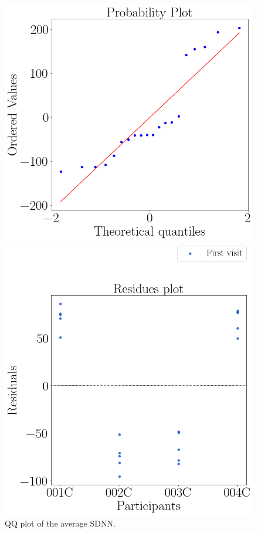         \begin{figure}[!htb]
            \begin{minipage}{0.45\linewidth}
                \centering
                \includegraphics[width = \linewidth]{Resultados/ECG/Figuras/png/qqplot_sdnn.png}
                \caption{QQ plot of the average SDNN.}
                \label{fig:qqplot_sdnn_average}
            \end{minipage}
            \begin{minipage}{0.1\linewidth}
                \hfill
            \end{minipage}
            \begin{minipage}{0.45\linewidth}
                \centering
                \includegraphics[width = \linewidth]{Resultados/ECG/Figuras/png/residplot_sdnn.png}

\end{minipage}
\end{figure}
